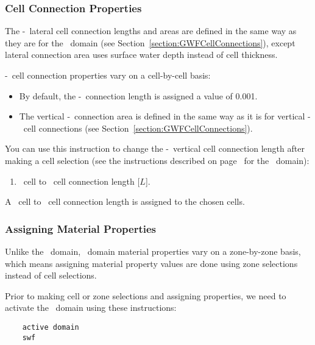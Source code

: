 
\subsubsection{Cell Connection Properties}  

The \swf-\swf\ lateral cell connection lengths and areas are defined in the same way as they are for the \gwf\ domain (see Section~\ref{section:GWFCellConnections}), except lateral connection area uses surface water depth instead of cell thickness.

\swf-\gwf\ cell connection properties vary on a cell-by-cell basis:
\begin{itemize}
     \item By default, the \swf-\gwf\ connection length is assigned a value of 0.001.
     \item The vertical \swf-\gwf\ connection area is defined in the same way as it is for vertical \gwf-\gwf\ cell connections (see Section~\ref{section:GWFCellConnections}).
\end{itemize}

You can use this instruction to change the \swf-\gwf\ vertical cell connection length after making a cell selection (see the instructions described on page~\pageref{page:cellSelect} for the \gwf\ domain):

    {
        \squish
        \begin{enumerate}
        \item {}  \swf\ cell to \gwf\ cell connection length [$L$].
        \end{enumerate}
          A \swf\ cell to \gwf\ cell connection length  is assigned to the chosen cells.
    }

\subsubsection{Assigning Material Properties}  
Unlike the \gwf\ domain, \swf\ domain material properties vary on a zone-by-zone basis, which means assigning material property values are done using zone selections instead of cell selections.

%
Prior to making cell or zone selections and assigning properties, we need to activate the \swf\ domain using these instructions:
\begin{verbatim}
    active domain
    swf
\end{verbatim}

